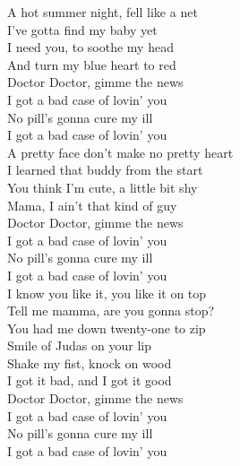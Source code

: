 \fontsize{8pt}{8pt}\selectfont

A hot summer night, fell like a net \\
I've gotta find my baby yet\\
I need you, to soothe my head\\
And turn my blue heart to red\\

Doctor Doctor, gimme the news\\
I got a bad case of lovin' you\\
No pill's gonna cure my ill\\
I got a bad case of lovin' you\\

A pretty face don't make no pretty heart\\
I learned that buddy from the start\\
You think I'm cute, a little bit shy\\
Mama, I ain't that kind of guy\\

Doctor Doctor, gimme the news\\
I got a bad case of lovin' you\\
No pill's gonna cure my ill\\
I got a bad case of lovin' you\\

I know you like it, you like it on top\\
Tell me mamma, are you gonna stop?\\

You had me down twenty-one to zip\\
Smile of Judas on your lip\\
Shake my fist, knock on wood\\
I got it bad, and I got it good\\

Doctor Doctor, gimme the news\\
I got a bad case of lovin' you\\
No pill's gonna cure my ill\\
I got a bad case of lovin' you\\
